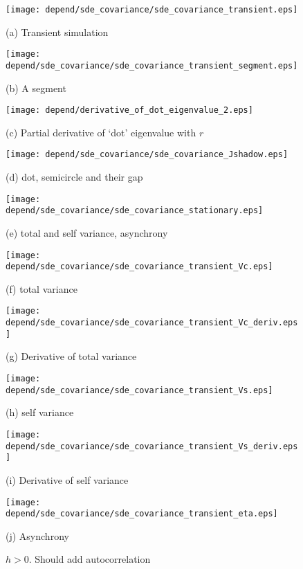 \documentclass[a4paper,fleqn,12pt]{article}
\begin{document}
\begin{figure}[htbp]
\begin{minipage}{0.45\linewidth}
  \texttt{[image: depend/sde\_covariance/sde\_covariance\_transient.eps]}
  {\centering(a) Transient simulation \par}
\end{minipage}
\hfill
\begin{minipage}{0.45\linewidth}
  \texttt{[image: depend/sde\_covariance/sde\_covariance\_transient\_segment.eps]}
  {\centering(b) A segment\par}
\end{minipage}
\vfill
\begin{minipage}{0.3\linewidth}
  \texttt{[image: depend/derivative\_of\_dot\_eigenvalue\_2.eps]}
  {\centering(c) Partial derivative of `dot' eigenvalue with $r$\par}
\end{minipage}
\begin{minipage}{0.3\linewidth}
  \texttt{[image: depend/sde\_covariance/sde\_covariance\_Jshadow.eps]}
  {\centering(d) dot, semicircle and their gap \par}
\end{minipage}
\hfill
\begin{minipage}{0.3\linewidth}
  \texttt{[image: depend/sde\_covariance/sde\_covariance\_stationary.eps]}
  {\centering(e) total and self variance, asynchrony\par}
\end{minipage}
\vfill
\begin{minipage}{0.3\linewidth}
  \texttt{[image: depend/sde\_covariance/sde\_covariance\_transient\_Vc.eps]}
  {\centering(f) total variance  \par}
\end{minipage}
\hfill
\begin{minipage}{0.3\linewidth}
  \texttt{[image: depend/sde\_covariance/sde\_covariance\_transient\_Vc\_deriv.eps]}
  {\centering(g) Derivative of total variance\par}
\end{minipage}
\vfill
\begin{minipage}{0.3\linewidth}
  \texttt{[image: depend/sde\_covariance/sde\_covariance\_transient\_Vs.eps]}
  {\centering(h) self variance  \par}
\end{minipage}
\hfill
\begin{minipage}{0.3\linewidth}
  \texttt{[image: depend/sde\_covariance/sde\_covariance\_transient\_Vs\_deriv.eps]}
  {\centering(i) Derivative of self variance\par}
\end{minipage}
\hfill
\begin{minipage}{0.3\linewidth}
  \texttt{[image: depend/sde\_covariance/sde\_covariance\_transient\_eta.eps]}
  {\centering(j) Asynchrony\par}
\end{minipage}
\caption{$h > 0$. {\color{red}Should add autocorrelation} }
\label{fig:sde_covariance}
\end{figure}
\end{document}
